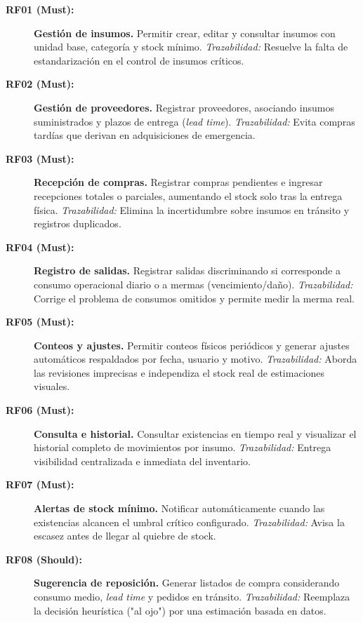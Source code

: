 \documentclass[11pt,letterpaper]{article}
\begin{document}
\begin{description}
    \item[\textbf{RF01 (Must):}] \textbf{Gestión de insumos.} Permitir crear, editar y consultar insumos con unidad base, categoría y stock mínimo. \textit{Trazabilidad:} Resuelve la falta de estandarización en el control de insumos críticos.
    
    \item[\textbf{RF02 (Must):}] \textbf{Gestión de proveedores.} Registrar proveedores, asociando insumos suministrados y plazos de entrega (\textit{lead time}). \textit{Trazabilidad:} Evita compras tardías que derivan en adquisiciones de emergencia.
    
    \item[\textbf{RF03 (Must):}] \textbf{Recepción de compras.} Registrar compras pendientes e ingresar recepciones totales o parciales, aumentando el stock solo tras la entrega física. \textit{Trazabilidad:} Elimina la incertidumbre sobre insumos en tránsito y registros duplicados.
    
    \item[\textbf{RF04 (Must):}] \textbf{Registro de salidas.} Registrar salidas discriminando si corresponde a consumo operacional diario o a mermas (vencimiento/daño). \textit{Trazabilidad:} Corrige el problema de consumos omitidos y permite medir la merma real.
    
    \item[\textbf{RF05 (Must):}] \textbf{Conteos y ajustes.} Permitir conteos físicos periódicos y generar ajustes automáticos respaldados por fecha, usuario y motivo. \textit{Trazabilidad:} Aborda las revisiones imprecisas e independiza el stock real de estimaciones visuales.
    
    \item[\textbf{RF06 (Must):}] \textbf{Consulta e historial.} Consultar existencias en tiempo real y visualizar el historial completo de movimientos por insumo. \textit{Trazabilidad:} Entrega visibilidad centralizada e inmediata del inventario.
    
    \item[\textbf{RF07 (Must):}] \textbf{Alertas de stock mínimo.} Notificar automáticamente cuando las existencias alcancen el umbral crítico configurado. \textit{Trazabilidad:} Avisa la escasez antes de llegar al quiebre de stock.
    
    \item[\textbf{RF08 (Should):}] \textbf{Sugerencia de reposición.} Generar listados de compra considerando consumo medio, \textit{lead time} y pedidos en tránsito. \textit{Trazabilidad:} Reemplaza la decisión heurística ("al ojo") por una estimación basada en datos.
    

\end{description}
\end{document}
